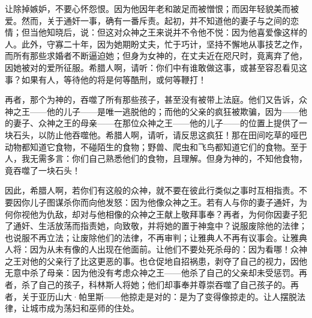 让除掉嫉妒，不要心怀怨恨。因为他因年老和跛足而被憎恨；而因年轻貌美而被爱。然而，关于通奸一事，确有一番斥责。起初，并不知道他的妻子与之间的恋情；但当他知晓后，说：但这对众神之王来说并不令他不悦：因为他喜爱像这样的人。此外，守寡二十年，因为她期盼丈夫，忙于巧计，坚持不懈地从事技艺之作，而所有那些求婚者不断逼迫她；但身为女神的，在丈夫近在咫尺时，竟离弃了他，因她被对的爱所征服。希腊人啊，请听：你们中有谁敢做这事，或甚至容忍看见这事？如果有人，等待他的将是何等酷刑，或何等鞭打！\par

再者，那个为神的，吞噬了所有那些孩子，甚至没有被带上法庭。他们又告诉，众神之王——他的儿子——是唯一逃脱他的；而他的父亲的疯狂被欺骗，因为——他的妻子、众神之王的母亲——在那位众神之王——他的儿子——的位置上提供了一块石头，以防止他吞噬他。希腊人啊，请听，请反思这疯狂！那在田间吃草的哑巴动物都知道它食物，不碰陌生的食物；野兽、爬虫和飞鸟都知道它们的食物。至于人，我无需多言：你们自己熟悉他们的食物，且理解。但身为神的，不知他食物，竟吞噬了一块石头！\par

因此，希腊人啊，若你们有这般的众神，就不要在彼此行类似之事时互相指责。不要因你儿子图谋杀你而向他发怒：因为他像众神之王。若有人与你的妻子通奸，为何你视他为仇敌，却对与他相像的众神之王献上敬拜事奉？再者，为何你因妻子犯了通奸、生活放荡而指责她，向致敬，并将她的置于神龛中？说服废除他的法律；也说服不再立法；让废除他们的法律，不再审判；让雅典人不再有议事会。让雅典人将：因为从未有像的人出现在他面前。让他们不要处死杀母的：因为看哪！众神之王对他的父亲行了比这更恶的事。也仓促地自招祸患，剥夺了自己的视力，因他无意中杀了母亲：因为他没有考虑众神之王——他杀了自己的父亲却未受惩罚。再者，杀了自己的孩子，科林斯人将她；他们却事奉并尊崇吞噬了自己孩子的。再者，关于亚历山大·帕里斯——他掠走是对的：是为了变得像掠走的。让人摆脱法律，让城市成为荡妇和巫师的住处。\par

